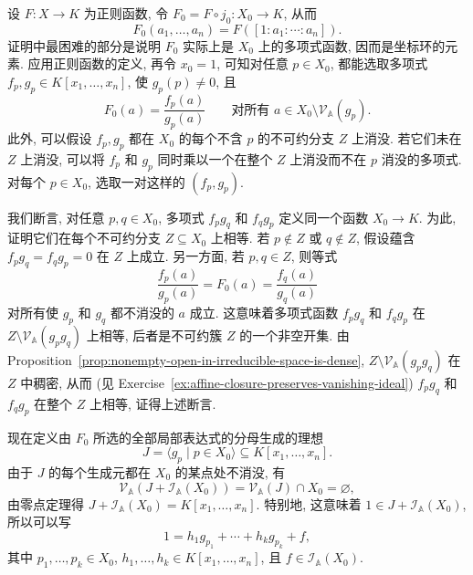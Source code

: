 \begin{Proof}
设 $F:X\to K$ 为正则函数, 令 $F_{0}=F\circ j_{0}:X_{0}\to K$, 从而
\[
  F_{0}(a_{1},\ldots,a_{n})=F([1:a_{1}:\cdots:a_{n}]).
\]
证明中最困难的部分是说明 $F_{0}$ 实际上是 $X_{0}$ 上的多项式函数, 因而是坐标环的元素. 应用正则函数的定义, 再令 $x_{0}=1$, 可知对任意 $p\in X_{0}$, 都能选取多项式 $f_{p},g_{p}\in K[x_{1},\ldots,x_{n}]$, 使 $g_{p}(p)\ne0$, 且
\[
  F_{0}(a)=\frac{f_{p}(a)}{g_{p}(a)}
  \qquad\text{对所有 }a\in X_{0}\setminus\mathcal{V}_{\mathbb{A}}(g_{p}).
\]
此外, 可以假设 $f_{p},g_{p}$ 都在 $X_{0}$ 的每个不含 $p$ 的不可约分支 $Z$ 上消没. 若它们未在 $Z$ 上消没, 可以将 $f_{p}$ 和 $g_{p}$ 同时乘以一个在整个 $Z$ 上消没而不在 $p$ 消没的多项式. 对每个 $p\in X_{0}$, 选取一对这样的 $(f_{p},g_{p})$.

我们断言, 对任意 $p,q\in X_{0}$, 多项式 $f_{p}g_{q}$ 和 $f_{q}g_{p}$ 定义同一个函数 $X_{0}\to K$. 为此, 证明它们在每个不可约分支 $Z\subseteq X_{0}$ 上相等. 若 $p\notin Z$ 或 $q\notin Z$, 假设蕴含 $f_{p}g_{q}=f_{q}g_{p}=0$ 在 $Z$ 上成立. 另一方面, 若 $p,q\in Z$, 则等式
\[
  \frac{f_{p}(a)}{g_{p}(a)}=F_{0}(a)=\frac{f_{q}(a)}{g_{q}(a)}
\]
对所有使 $g_{p}$ 和 $g_{q}$ 都不消没的 $a$ 成立. 这意味着多项式函数 $f_{p}g_{q}$ 和 $f_{q}g_{p}$ 在 $Z\setminus\mathcal{V}_{\mathbb{A}}(g_{p}g_{q})$ 上相等, 后者是不可约簇 $Z$ 的一个非空开集. 由 Proposition~\ref{prop:nonempty-open-in-irreducible-space-is-dense}, $Z\setminus\mathcal{V}_{\mathbb{A}}(g_{p}g_{q})$ 在 $Z$ 中稠密, 从而 (见 Exercise~\ref{ex:affine-closure-preserves-vanishing-ideal}) $f_{p}g_{q}$ 和 $f_{q}g_{p}$ 在整个 $Z$ 上相等, 证得上述断言.

现在定义由 $F_{0}$ 所选的全部局部表达式的分母生成的理想
\[
  J=\langle g_{p}\mid p\in X_{0}\rangle\subseteq K[x_{1},\ldots,x_{n}].
\]
由于 $J$ 的每个生成元都在 $X_{0}$ 的某点处不消没, 有
\[
  \mathcal{V}_{\mathbb{A}}(J+\mathcal{I}_{\mathbb{A}}(X_{0}))
   =\mathcal{V}_{\mathbb{A}}(J)\cap X_{0}=\varnothing,
\]
由零点定理得 $J+\mathcal{I}_{\mathbb{A}}(X_{0})=K[x_{1},\ldots,x_{n}]$. 特别地, 这意味着 $1\in J+\mathcal{I}_{\mathbb{A}}(X_{0})$, 所以可以写
\begin{equation}\label{eq:local-denominators-generate-unit-modulo-affine-ideal}
  1=h_{1}g_{p_{1}}+\cdots+h_{k}g_{p_{k}}+f,
\end{equation}
其中 $p_{1},\ldots,p_{k}\in X_{0}$, $h_{1},\ldots,h_{k}\in K[x_{1},\ldots,x_{n}]$, 且 $f\in\mathcal{I}_{\mathbb{A}}(X_{0})$.


\end{Proof}
